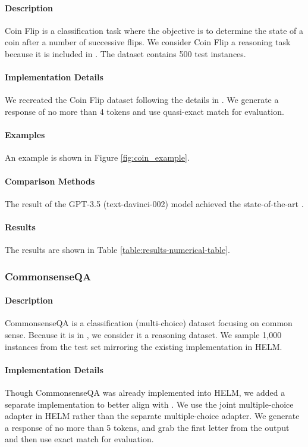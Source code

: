 \paragraph{Description} Coin Flip \citep{wei2023chainofthought} is a classification task where the objective is to determine the state of a coin after a number of successive flips. We consider Coin Flip a reasoning task because it is included in \citet{kojima2023large}. The dataset contains 500 test instances.

\paragraph{Implementation Details}
We recreated the Coin Flip dataset following the details in \citet{kojima2023large}. We generate a response of no more than 4 tokens and use quasi-exact match for evaluation. 

\paragraph{Examples} An example is shown in Figure \ref{fig:coin_example}.

\paragraph{Comparison Methods}
The result of the GPT-3.5 (text-davinci-002) model achieved the state-of-the-art \citep{zhang2022automatic}.

\paragraph{Results} The results are shown in Table \ref{table:results-numerical-table}.

\subsubsection{CommonsenseQA}
\paragraph{Description} CommonsenseQA \citep{talmor2019commonsenseqa} is a classification (multi-choice) dataset focusing on common sense. Because it is in \citet{kojima2023large}, we consider it a reasoning dataset. We sample 1,000 instances from the test set mirroring the existing implementation in HELM.

\paragraph{Implementation Details}
Though CommonsenseQA was already implemented into HELM, we added a separate implementation to better align with \citet{kojima2023large}. We use the joint multiple-choice adapter in HELM rather than the separate multiple-choice adapter. We generate a response of no more than 5 tokens, and grab the first letter from the output and then use exact match for evaluation.


